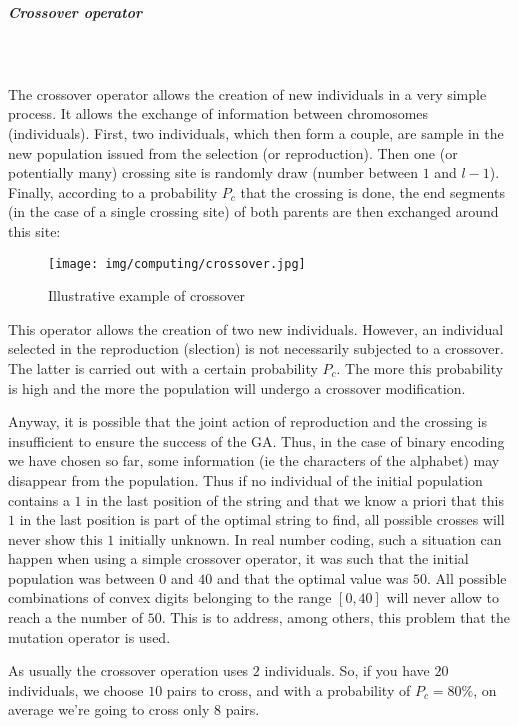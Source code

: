 	\subparagraph{Crossover operator}\mbox{}\\\\
	The crossover operator allows the creation of new individuals in a very simple process. It allows the exchange of information between chromosomes (individuals). First, two individuals, which then form a couple, are sample in the new population issued from the selection (or reproduction). Then one (or potentially many) crossing site is randomly draw (number between $1$ and $l-1$). Finally, according to a probability $P_c$ that the crossing is done, the end segments (in the case of a single crossing site) of both parents are then exchanged around this site:
	\begin{figure}[H]
		\centering
		\texttt{[image: img/computing/crossover.jpg]}
		\caption{Illustrative example of crossover}
	\end{figure}
	This operator allows the creation of two new individuals. However, an individual selected in the reproduction (slection) is not necessarily subjected to a crossover. The latter is carried out with a certain probability $P_c$. The more this probability is high and the more the population will undergo a crossover modification.

	Anyway, it is possible that the joint action of reproduction and the crossing is insufficient to ensure the success of the GA. Thus, in the case of binary encoding we have chosen so far, some information (ie the characters of the alphabet) may disappear from the population. Thus if no individual of the initial population contains a $1$ in the last position of the string and that we know a priori that this $1$ in the last position is part of the optimal string to find, all possible crosses will never show this $1$ initially unknown. In real number coding, such a situation can happen when using a simple crossover operator, it was such that the initial population was between $0$ and $40$ and that the optimal value was $50$. All possible combinations of convex digits belonging to the range $[0,40]$ will never allow to reach a the number of $50$. This is to address, among others, this problem that the mutation operator is used.
	
	As usually the crossover operation uses $2$ individuals. So, if you have $20$ individuals, we choose $10$ pairs to cross, and with a probability of $P_c=80\%$, on average we're going to cross only $8$ pairs.
	

